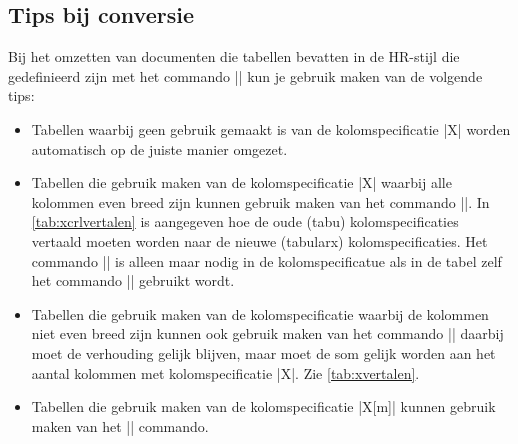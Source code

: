 \begin{llstShortInline}
	\clearpage
	\section{Tips bij conversie}
	Bij het omzetten van documenten die tabellen bevatten in de HR-stijl die gedefinieerd zijn met het commando |\tabel| kun je gebruik maken van de volgende tips:
	\begin{itemize}
		\item 
		Tabellen waarbij geen gebruik gemaakt is van de kolomspecificatie |X| worden automatisch op de juiste manier omgezet.
		\item 
		Tabellen die gebruik maken van de kolomspecificatie |X| waarbij alle kolommen even breed zijn kunnen gebruik maken van het commando |\tabelX|. In \cref{tab:xcrlvertalen} is aangegeven hoe de oude (tabu) kolomspecificaties vertaald moeten worden naar de nieuwe (tabularx) kolomspecificaties.
		Het commando |\arraybackslash| is alleen maar nodig in de kolomspecificatue als in de tabel zelf het commando |\newline| gebruikt wordt.
		\item 
		Tabellen die gebruik maken van de kolomspecificatie waarbij de kolommen niet even breed zijn kunnen ook gebruik maken van het commando |\tabelX| daarbij moet de verhouding gelijk blijven, maar moet de som gelijk worden aan het aantal kolommen met kolomspecificatie |X|. 
		Zie \cref{tab:xvertalen}.
		\item 
		Tabellen die gebruik maken van de kolomspecificatie |X[m]| kunnen gebruik maken van het |\tabelXm| commando. 
	\end{itemize} 
	
	

\end{llstShortInline}
